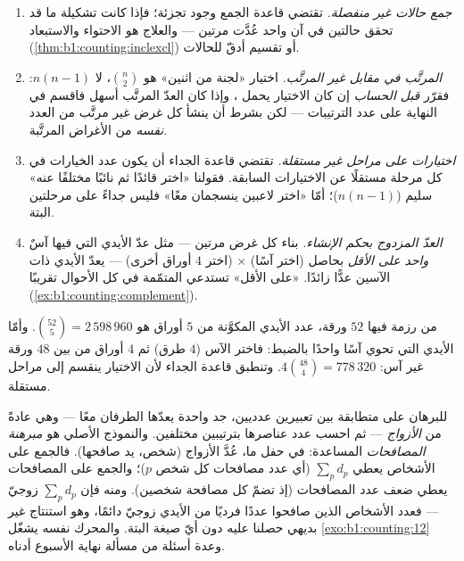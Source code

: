 \begin{remark}\label{rem:b1:counting:pitfalls}
\begin{enumerate}
  \item \emph{جمع حالات غير منفصلة.} تقتضي قاعدة الجمع وجود
        تجزئة؛ فإذا كانت تشكيلة ما قد تحقق حالتين في آن واحد
        عُدَّت مرتين --- والعلاج هو الاحتواء والاستبعاد
        (\cref{thm:b1:counting:inclexcl}) أو تقسيم أدقّ للحالات.
  \item \emph{المرتَّب في مقابل غير المرتَّب.} اختيار «لجنة من
        اثنين» هو $\binom n2$، لا $n(n-1)$: فقرّر \emph{قبل
        الحساب} إن كان الاختيار يحمل ، وإذا كان العدّ
        المرتَّب أسهل فاقسم في النهاية على عدد الترتيبات ---
        لكن بشرط أن ينشأ كل غرض غير مرتَّب من العدد \emph{نفسه}
        من الأغراض المرتَّبة.
  \item \emph{اختيارات على مراحل غير مستقلة.}
        تقتضي قاعدة الجداء أن يكون عدد الخيارات في كل مرحلة
        مستقلًا عن الاختيارات السابقة. فقولنا «اختر قائدًا ثم نائبًا
        مختلفًا عنه» سليم ($n(n-1)$)؛ أمّا «اختر لاعبين ينسجمان
        معًا» فليس جداءً على مرحلتين البتة.
  \item \emph{العدّ المزدوج بحكم الإنشاء.} بناء كل غرض مرتين ---
        مثل عدّ الأيدي التي فيها آسٌ \emph{واحد على الأقل}
        بحاصل (اختر آسًا) $\times$ (اختر $4$ أوراق أخرى) --- يعدّ
        الأيدي ذات الآسين عدًّا زائدًا.  «على الأقل»
        تستدعي المتمّمة في كل الأحوال تقريبًا
        (\cref{ex:b1:counting:complement}).
\end{enumerate}
\end{remark}

\begin{example}\label{ex:b1:counting:poker}
من رزمة فيها $52$ ورقة، عدد الأيدي المكوَّنة من $5$ أوراق هو
$\binom{52}{5} = 2\,598\,960$. وأمّا الأيدي التي تحوي آسًا واحدًا بالضبط:
فاختر الآس ($4$ طرق) ثم $4$ أوراق من بين $48$ ورقة غير آس:
$4 \binom{48}{4} = 778\,320$. وتنطبق قاعدة الجداء لأن الاختيار
ينقسم إلى مراحل مستقلة.
\end{example}

\begin{method}\label{met:b1:counting:doublecount}
للبرهان على متطابقة بين تعبيرين عدديين، جد  واحدة
يعدّها الطرفان معًا --- وهي عادةً  من \emph{الأزواج} ---
ثم احسب عدد عناصرها بترتيبين مختلفين. والنموذج الأصلي هو
\emph{مبرهنة المصافحات} المساعدة: في حفل ما، عُدَّ الأزواج
(شخص، يد صافحها). فالجمع على الأشخاص يعطي $\sum_p d_p$ (أي عدد مصافحات كل شخص $p$)؛ والجمع على المصافحات يعطي ضعف
عدد المصافحات (إذ تضمّ كل مصافحة شخصين). ومنه فإن
$\sum_p d_p$ زوجيّ --- فعدد الأشخاص الذين صافحوا عددًا فرديًا
من الأيدي زوجيّ دائمًا، وهو استنتاج غير بديهي حصلنا عليه دون
أيّ صيغة البتة. والمحرك نفسه يشغّل
\cref{exo:b1:counting:12} وعدة أسئلة من مسألة نهاية الأسبوع
أدناه.
\end{method}

